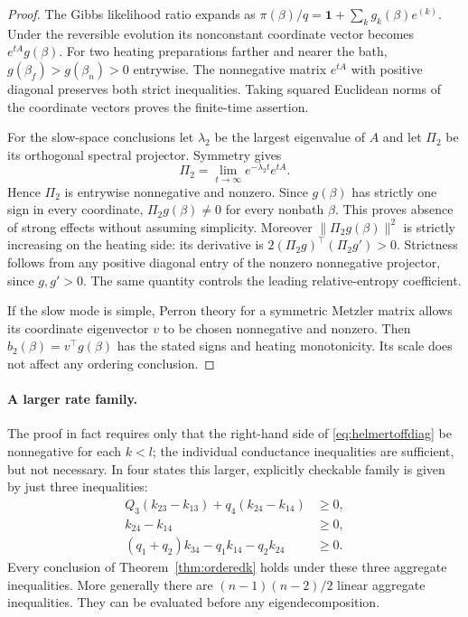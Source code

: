 \documentclass[11pt]{article}
\begin{document}
\begin{proof}
The Gibbs likelihood ratio expands as
$\pi(\beta)/q=\mathbf1+\sum_k g_k(\beta)e^{(k)}$.
Under the reversible evolution its nonconstant coordinate vector becomes
$e^{tA}g(\beta)$. For two heating preparations farther and nearer the bath,
$g(\beta_f)>g(\beta_n)>0$ entrywise. The nonnegative matrix $e^{tA}$ with
positive diagonal preserves both strict inequalities. Taking squared
Euclidean norms of the coordinate vectors proves the finite-time assertion.

For the slow-space conclusions let $\lambda_2$ be the largest eigenvalue
of $A$ and let $\Pi_2$ be its orthogonal spectral projector. Symmetry gives
\[
\Pi_2=\lim_{t\to\infty}e^{-\lambda_2t}e^{tA}.
\]
Hence $\Pi_2$ is entrywise nonnegative and nonzero. Since $g(\beta)$ has
strictly one sign in every coordinate, $\Pi_2g(\beta)\ne0$ for every
nonbath $\beta$. This proves absence of strong effects without assuming
simplicity. Moreover $\|\Pi_2g(\beta)\|^2$ is strictly increasing on the
heating side: its derivative is
$2(\Pi_2g)^\top(\Pi_2g')>0$. Strictness follows from any positive diagonal
entry of the nonzero nonnegative projector, since $g,g'>0$. The same
quantity controls the leading relative-entropy coefficient.

If the slow mode is simple, Perron theory for a symmetric Metzler matrix
allows its coordinate eigenvector $v$ to be chosen nonnegative and nonzero.
Then $b_2(\beta)=v^\top g(\beta)$ has the stated signs and heating
monotonicity. Its scale does not affect any ordering conclusion.
\end{proof}

\paragraph{A larger rate family.}
The proof in fact requires only that the right-hand side of
\eqref{eq:helmertoffdiag} be nonnegative for each $k<l$; the individual
conductance inequalities are sufficient, but not necessary. In four states
this larger, explicitly checkable family is given by just three inequalities:
\begin{align*}
Q_3(k_{23}-k_{13})+q_4(k_{24}-k_{14})&\geq0,\\
k_{24}-k_{14}&\geq0,\\
(q_1+q_2)k_{34}-q_1k_{14}-q_2k_{24}&\geq0.
\end{align*}
Every conclusion of Theorem~\ref{thm:orderedk} holds under these three
aggregate inequalities. More generally there are $(n-1)(n-2)/2$ linear
aggregate inequalities. They can be evaluated before any eigendecomposition.
\end{document}
